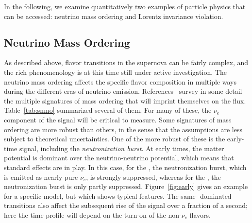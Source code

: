 
In the following, we examine quantitatively two examples of particle
physics that can be accessed: neutrino mass ordering and Lorentz
invariance violation.


\subsection{Neutrino Mass Ordering}\label{sec:mh}


As described above, flavor transitions
in the supernova can be fairly complex, and the rich phenomenology is
at this time still under active investigation.  The neutrino mass
ordering affects the specific flavor composition in multiple ways
during the different eras of neutrino emission.  
References~\cite{Mirizzi:2015eza,Scholberg:2017czd} survey in some detail the
multiple signatures of mass ordering that will imprint themselves on
the flux.  Table~\ref{tab:snmo} summarized several of them. For many of these, the $\nu_e$ component of the signal will
be critical to measure.    Some signatures of mass ordering are more robust than
others, in the sense that the assumptions are less subject to
theoretical uncertainties.  One of the more robust of these is the
early-time signal, including the \textit{neutronization burst}.   At
early times, the matter potential is dominant over the
neutrino-neutrino potential, which means that standard  effects are
in play.  In this case, for the , the neutronization burst, which is
emitted as nearly pure $\nu_e$, is strongly suppressed, whereas for
the , the neutronization burst is only partly suppressed.  
Figure~\ref{fig:early} gives an example for a specific model, but which
shows typical features.  The same -dominated transitions also
affect
the subsequent rise of the signal over a fraction of a second; here
the time profile will depend on the turn-on of the non-$\nu_e$ flavors.

